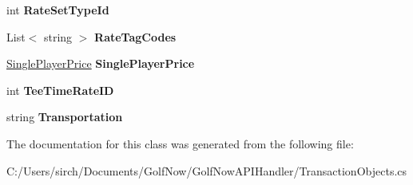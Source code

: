 \begin{DoxyCompactItemize}
int {\bfseries Rate\+Set\+Type\+Id}
\item 
\mbox{\label{class_golf_now_a_p_i_handler_1_1_display_rate_a61caeae1c4455aa41283d8c5fafa22d7}} 
List$<$ string $>$ {\bfseries Rate\+Tag\+Codes}
\item 
\mbox{\label{class_golf_now_a_p_i_handler_1_1_display_rate_a26a18f198cd836c52fddd3c019a65fc4}} 
\mbox{\hyperlink{class_golf_now_a_p_i_handler_1_1_single_player_price}{Single\+Player\+Price}} {\bfseries Single\+Player\+Price}
\item 
\mbox{\label{class_golf_now_a_p_i_handler_1_1_display_rate_affa0bc3f6eb664fb651745f5a093e029}} 
int {\bfseries Tee\+Time\+Rate\+ID}
\item 
\mbox{\label{class_golf_now_a_p_i_handler_1_1_display_rate_ae2ba9ce5711c3a21116f056af8723f8b}} 
string {\bfseries Transportation}
\end{DoxyCompactItemize}


The documentation for this class was generated from the following file\+:\begin{DoxyCompactItemize}
\item 
C\+:/\+Users/sirch/\+Documents/\+Golf\+Now/\+Golf\+Now\+A\+P\+I\+Handler/Transaction\+Objects.\+cs\end{DoxyCompactItemize}
